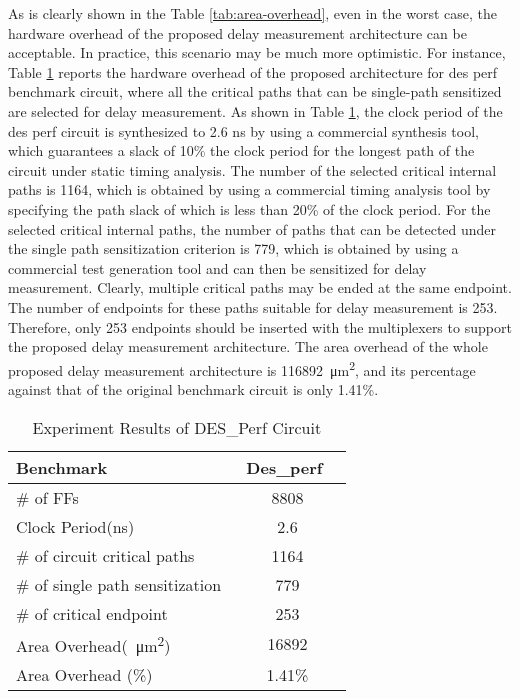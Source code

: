 As is clearly shown in the Table \ref{tab:area-overhead}, even in the worst case, the hardware overhead of the proposed delay measurement architecture can be acceptable. In practice, this scenario may be much more optimistic. For instance, Table \ref{tab:des-perf} reports the hardware overhead of the proposed architecture for des perf benchmark circuit, where all the critical paths that can be single-path sensitized are selected for delay measurement. As shown in Table \ref{tab:des-perf}, the clock period of the des perf circuit is synthesized to 2.6 ns by using a commercial synthesis tool, which guarantees a slack of 10\% the clock period for the longest path of the circuit under static timing analysis. The number of the selected critical internal paths is 1164, which is obtained by using a commercial timing analysis tool by specifying the path slack of which is less than 20\% of the clock period. For the selected critical internal paths, the number of paths that can be detected under the single path sensitization criterion is 779, which is obtained by using a commercial test generation tool and can then be sensitized for delay measurement. Clearly, multiple critical paths may be ended at the same endpoint. The number of endpoints for these paths suitable for delay measurement is 253. Therefore, only 253 endpoints should be inserted with the multiplexers to support the proposed delay measurement architecture. The area overhead of the whole proposed delay measurement architecture is \SI{116892}{\micro\metre^2}, and its percentage against that of the original benchmark circuit is only 1.41\%.

\begin{table}[]
  \begin{center}
    \setlength{\tabcolsep}{4mm}
    \scriptsize
    \caption{Experiment Results of DES\_Perf Circuit} \label{tab:des-perf}
    \begin{tabular}{@{}lc}
        \toprule
        Benchmark                       &  \ Des\_perf \  \\ 
        \midrule
        \# of FFs                       & 8808      \\ 
        Clock Period(ns)                & 2.6       \\ 
        \# of circuit critical paths    & 1164      \\ 
        \# of single path sensitization & 779       \\ 
        \# of critical endpoint         & 253       \\ 
        Area Overhead(\SI{}{\micro\metre^2})              & 16892     \\ 
        Area Overhead (\%)              & 1.41\%    \\ 
        \bottomrule
    \end{tabular}
  \end{center}
\end{table}


